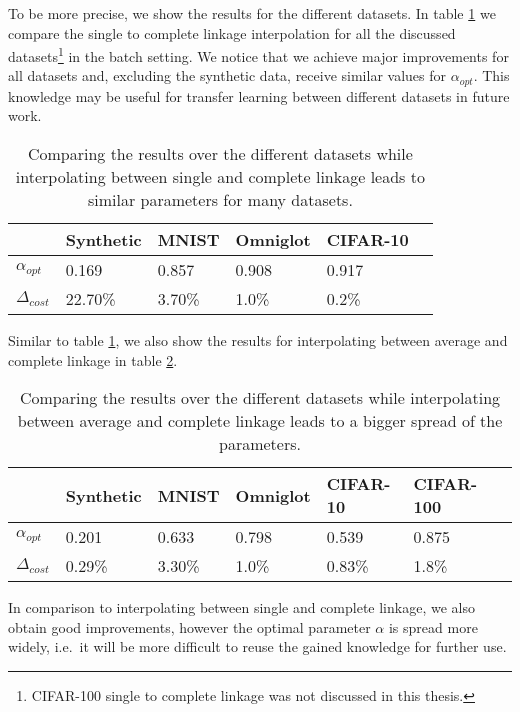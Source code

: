 To be more precise, we show the results for the different datasets. In table \ref{table:comparison} we compare the single to complete linkage interpolation for all the discussed datasets\footnote{CIFAR-100 single to complete linkage was not discussed in this thesis.} in the batch setting. We notice that we achieve major improvements for all datasets and, excluding the synthetic data, receive similar values for $\alpha_{opt}$. This knowledge may be useful for transfer learning between different datasets in future work.

\begin{table}[H]
    \centering
    \begin{tabular}{|l | l | l | l | l | l |}
    \hline
    & Synthetic & MNIST & Omniglot & CIFAR-10\\ \hline
    $\alpha_{opt}$ & 0.169 & 0.857 & 0.908 & 0.917\\
    $\Delta_{cost}$ & 22.70\% & 3.70\% & 1.0\% & 0.2\%\\\hline
    \end{tabular}
    \caption{Comparing the results over the different datasets while interpolating between single and complete linkage leads to similar parameters for many datasets.}
    \label{table:comparison}
\end{table}

Similar to table \ref{table:comparison}, we also show the results for interpolating between average and complete linkage in table \ref{table:comparison_ac}.

\begin{table}[H]
    \centering
    \begin{tabular}{|l | l | l | l | l | l | l |}
    \hline
    & Synthetic & MNIST & Omniglot & CIFAR-10 & CIFAR-100\\ \hline
    $\alpha_{opt}$ & 0.201 & 0.633 & 0.798 & 0.539 & 0.875\\
    $\Delta_{cost}$ & 0.29\% & 3.30\% & 1.0\% & 0.83\% & 1.8\%\\\hline
    \end{tabular}
    \caption{Comparing the results over the different datasets while interpolating between average and complete linkage leads to a bigger spread of the parameters.}
    \label{table:comparison_ac}
\end{table}

In comparison to interpolating between single and complete linkage, we also obtain good improvements, however the optimal parameter $\alpha$ is spread more widely, i.e.\ it will be more difficult to reuse the gained knowledge for further use.\\

